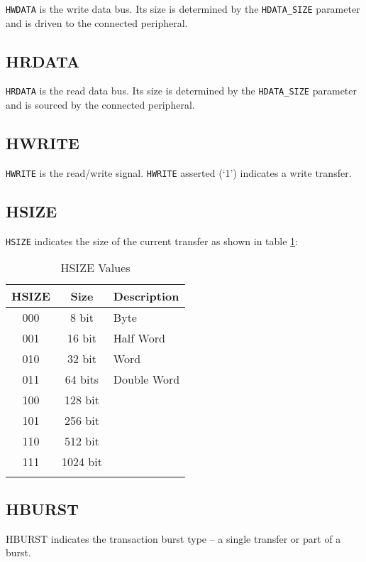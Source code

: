 \texttt{HWDATA} is the write data bus. Its size is determined by the
\texttt{HDATA\_SIZE} parameter and is driven to the connected
peripheral.

\subsection{HRDATA}

\texttt{HRDATA} is the read data bus. Its size is determined by the
\texttt{HDATA\_SIZE} parameter and is sourced by the connected
peripheral.

\subsection{HWRITE}

\texttt{HWRITE} is the read/write signal. \texttt{HWRITE} asserted (`1')
indicates a write transfer.

\subsection{HSIZE}

\texttt{HSIZE} indicates the size of the current transfer as shown in table \ref{tab:HSIZE}:

\begin{longtable}[c]{@{\extracolsep{\fill}}ccl}	
		\toprule 
		\textbf{HSIZE} & \textbf{Size} & \textbf{Description}\\
		\midrule
		\endhead 
		000 & 8 bit & Byte\\
		001 & 16 bit & Half Word\\
		010 & 32 bit & Word\\
		011 & 64 bits & Double Word\\
		100 & 128 bit &\\
		101 & 256 bit &\\
		110 & 512 bit &\\
		111 & 1024 bit &\\
		\bottomrule 	
	\caption{HSIZE Values}
	\label{tab:HSIZE}
\end{longtable}

\subsection{HBURST}

HBURST indicates the transaction burst type -- a single transfer or part
of a burst.

